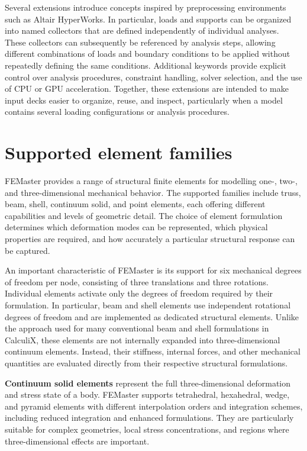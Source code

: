 Several extensions introduce concepts inspired by preprocessing environments such as Altair HyperWorks. In particular, loads and supports can be organized into named collectors that are defined independently of individual analyses. These collectors can subsequently be referenced by analysis steps, allowing different combinations of loads and boundary conditions to be applied without repeatedly defining the same conditions. Additional keywords provide explicit control over analysis procedures, constraint handling, solver selection, and the use of CPU or GPU acceleration. Together, these extensions are intended to make input decks easier to organize, reuse, and inspect, particularly when a model contains several loading configurations or analysis procedures.


\section{Supported element families}

FEMaster provides a range of structural finite elements for modelling one-, two-, and three-dimensional mechanical behavior. The supported families include truss, beam, shell, continuum solid, and point elements, each offering different capabilities and levels of geometric detail. The choice of element formulation determines which deformation modes can be represented, which physical properties are required, and how accurately a particular structural response can be captured.

An important characteristic of FEMaster is its support for six mechanical degrees of freedom per node, consisting of three translations and three rotations. Individual elements activate only the degrees of freedom required by their formulation. In particular, beam and shell elements use independent rotational degrees of freedom and are implemented as dedicated structural elements. Unlike the approach used for many conventional beam and shell formulations in CalculiX, these elements are not internally expanded into three-dimensional continuum elements. Instead, their stiffness, internal forces, and other mechanical quantities are evaluated directly from their respective structural formulations.

\textbf{Continuum solid elements} represent the full three-dimensional deformation and stress state of a body. FEMaster supports tetrahedral, hexahedral, wedge, and pyramid elements with different interpolation orders and integration schemes, including reduced integration and enhanced formulations. They are particularly suitable for complex geometries, local stress concentrations, and regions where three-dimensional effects are important.

